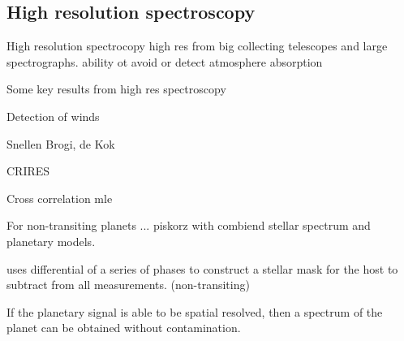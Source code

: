\subsection{High resolution spectroscopy}
High resolution spectrocopy   
high res from big collecting  telescopes and large spectrographs. ability ot avoid or detect atmosphere absorption

Some key results from high res spectroscopy

Detection of winds

Snellen Brogi, de Kok

CRIRES 

Cross correlation mle \citet{piskorz_evidence_2016}


For non-transiting planets ... piskorz  with combiend stellar spectrum and planetary models.


\citet{rodler_weighing_2012} uses differential of a series of phases to construct a stellar mask for the host to subtract from all measurements. (non-transiting)


If the planetary signal is able to be spatial resolved, then a spectrum of the planet can be obtained without contamination.